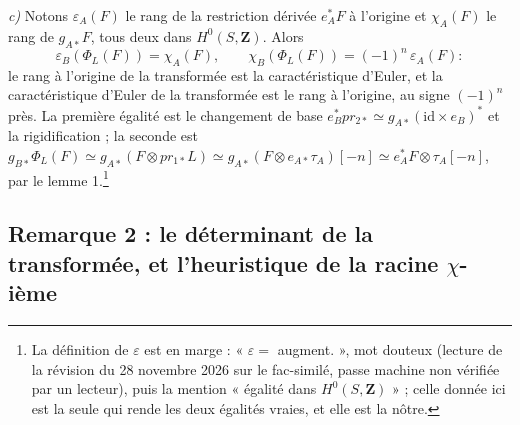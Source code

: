 \documentclass[11pt,a4paper]{article}
\begin{document}
\emph{c)} Notons $\varepsilon_A(F)$ le rang de la restriction dérivée
$e_A^{*}F$ à l'origine et $\chi_A(F)$ le rang de $g_{A*}F$, tous deux dans
$H^{0}(S, \mathbf{Z})$. Alors
\[
  \varepsilon_B(\Phi_L(F)) = \chi_A(F),
  \qquad
  \chi_B(\Phi_L(F)) = (-1)^n\,\varepsilon_A(F) :
\]
le rang à l'origine de la transformée est la caractéristique d'Euler, et la
caractéristique d'Euler de la transformée est le rang à l'origine, au signe
$(-1)^n$ près. La première égalité est le changement de base $e_B^{*}pr_{2*}
\simeq g_{A*}(\mathrm{id} \times e_B)^{*}$ et la rigidification ; la seconde
est $g_{B*}\Phi_L(F) \simeq g_{A*}(F \otimes pr_{1*}L) \simeq g_{A*}(F
\otimes e_{A*}\tau_A)[-n] \simeq e_A^{*}F \otimes \tau_A[-n]$, par le
lemme 1.\footnote{La définition de $\varepsilon$ est en marge :
« $\varepsilon = $ augment. », mot douteux (lecture de la révision du
28 novembre 2026 sur le fac-similé, passe machine non vérifiée par un lecteur),
puis la mention « égalité dans $H^{0}(S, \mathbf{Z})$ » ; celle donnée ici
est la seule qui rende les deux égalités vraies, et elle est la nôtre.}

\subsection*{Remarque 2 : le déterminant de la transformée, et l'heuristique de la racine $\chi$-ième}
\end{document}
